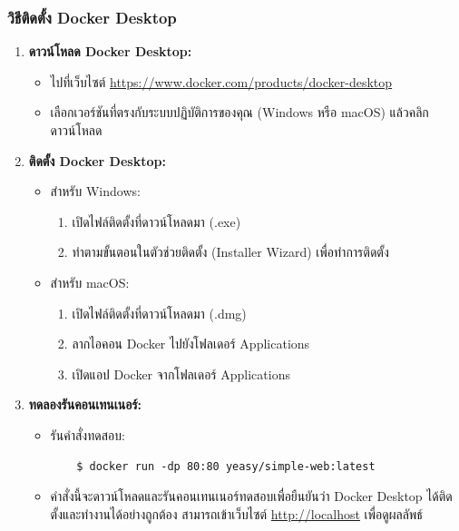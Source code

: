 \subsubsection{วิธีติดตั้ง Docker Desktop}
\begin{enumerate}
    \item \textbf{ดาวน์โหลด Docker Desktop:}
          \begin{itemize}
              \item ไปที่เว็บไซต์ \url{https://www.docker.com/products/docker-desktop}
              \item เลือกเวอร์ชันที่ตรงกับระบบปฏิบัติการของคุณ (Windows หรือ macOS) แล้วคลิกดาวน์โหลด
          \end{itemize}

    \item \textbf{ติดตั้ง Docker Desktop:}
          \begin{itemize}
              \item สำหรับ Windows:
                    \begin{enumerate}
                        \item เปิดไฟล์ติดตั้งที่ดาวน์โหลดมา (.exe)
                        \item ทำตามขั้นตอนในตัวช่วยติดตั้ง (Installer Wizard) เพื่อทำการติดตั้ง
                    \end{enumerate}
              \item สำหรับ macOS:
                    \begin{enumerate}
                        \item เปิดไฟล์ติดตั้งที่ดาวน์โหลดมา (.dmg)
                        \item ลากไอคอน Docker ไปยังโฟลเดอร์ Applications
                        \item เปิดแอป Docker จากโฟลเดอร์ Applications
                    \end{enumerate}
          \end{itemize}

    \item \textbf{ทดลองรันคอนเทนเนอร์:}
          \begin{itemize}
              \item รันคำสั่งทดสอบ:
                    \begin{verbatim}
    $ docker run -dp 80:80 yeasy/simple-web:latest
            \end{verbatim}
              \item คำสั่งนี้จะดาวน์โหลดและรันคอนเทนเนอร์ทดสอบเพื่อยืนยันว่า Docker Desktop ได้ติดตั้งและทำงานได้อย่างถูกต้อง สามารถเข้าเว็บไซต์ \url{http://localhost} เพื่อดูผลลัพธ์
          \end{itemize}
\end{enumerate}
